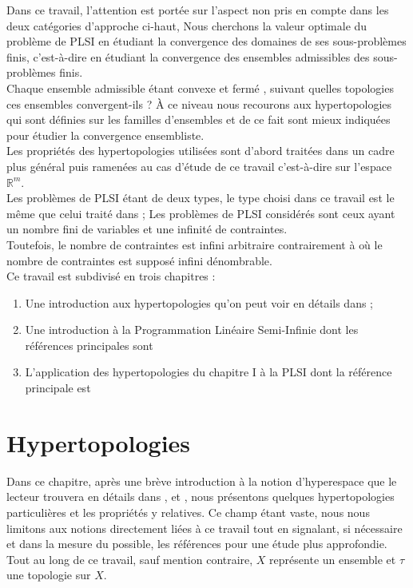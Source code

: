 \documentclass[11pt]{report}
\makeatletter
\theoremstyle{styletheorem}
\theoremstyle{styledef}
\theoremstyle{remark}
\newcommand{\ie}{c'est-à-dire }
\newcommand{\R}{\ensuremath{\mathbb{R}}}
\newcommand\mainmatter{%
	\cleardoublepage
	\pagenumbering{arabic}}
\makeatother
\begin{document}
 	Dans ce travail, l'attention est portée sur l'aspect non pris en compte dans les deux catégories d'approche ci-haut, Nous cherchons la valeur optimale du problème de PLSI en étudiant la convergence des domaines de ses sous-problèmes finis, \ie  en étudiant la convergence des ensembles admissibles des sous-problèmes finis.\\
 	Chaque ensemble  admissible étant convexe et fermé \cite{b16}, suivant quelles topologies ces ensembles  convergent-ils ? À ce niveau nous recourons aux hypertopologies \cite{b8} qui sont définies sur les familles d'ensembles et de ce fait sont mieux indiquées pour étudier la convergence ensembliste.\\
 	Les propriétés des hypertopologies utilisées sont d'abord traitées dans un cadre plus  général puis ramenées au cas d'étude de ce travail \ie sur l'espace $\R^m$.\\
 	
 	Les problèmes de PLSI étant de deux types, le type choisi dans ce travail est le même que celui traité dans \cite{b2}\cite{b22}; Les problèmes de PLSI considérés sont ceux ayant un nombre fini de variables et une infinité de contraintes.\\
 	Toutefois, le nombre de contraintes est infini arbitraire contrairement à \cite{b22} où le nombre de contraintes est supposé infini dénombrable. \\
 	
 	Ce travail est subdivisé en trois chapitres :
 	\begin{enumerate}
 		\item Une introduction aux hypertopologies qu'on peut voir en détails dans \cite{b8}\cite{b7};
 		\item Une introduction à la Programmation Linéaire Semi-Infinie dont les références principales sont \cite{b2}\cite{b8}
 		\item L'application des hypertopologies du chapitre I à la PLSI dont la référence principale est \cite{b21}
 	\end{enumerate}
 	
 
\newpage \tableofcontents


\mainmatter
\chapter{Hypertopologies}
Dans ce chapitre, après une brève introduction à la notion d'hyperespace que le lecteur trouvera en détails dans \cite{b5,b1}, \cite{b6} et \cite{b7},  nous présentons quelques hypertopologies particulières et les propriétés y relatives. Ce champ étant vaste, nous nous limitons aux notions directement liées à ce travail tout en signalant, si nécessaire et dans la mesure du possible, les références pour une étude plus approfondie.\\
Tout au long de ce travail, sauf mention contraire, $X$ représente un ensemble et $\tau$ une topologie sur $X$.
\end{document}
